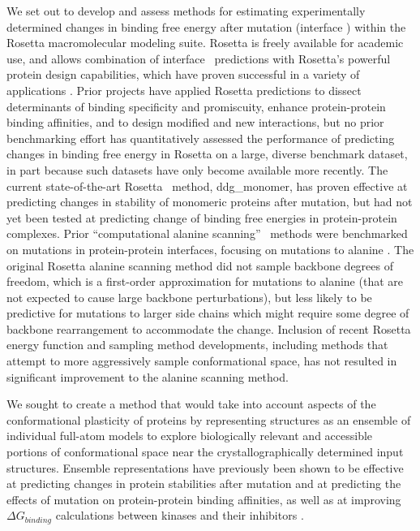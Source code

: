 We set out to develop and assess methods for estimating experimentally determined changes in binding free energy after mutation (interface \ddg) within the Rosetta macromolecular modeling suite. Rosetta is freely available for academic use, and allows combination of interface \ddg\ predictions with Rosetta's powerful protein design capabilities, which have proven successful in a variety of applications \cite{mandell_computer-aided_2009,kaufmann_practically_2010}.
Prior projects have applied Rosetta predictions to
dissect determinants of binding specificity and promiscuity\cite{boulanger_convergent_2003,mcfarland_symmetry_2003},
enhance protein-protein binding affinities\cite{sammond_structure-based_2007,song_rational_2006},
and to design modified\cite{kapp_control_2012}
and new interactions\cite{chevalier_design_2002,fleishman_computational_2011,chevalier_massively_2017}, but no prior benchmarking effort has quantitatively assessed the performance of predicting changes in binding free energy in Rosetta on a large, diverse benchmark dataset, in part because such datasets have only become available more recently.
The current state-of-the-art Rosetta \ddg\ method,  ddg\_monomer\cite{kellogg_role_2011}, has proven effective at predicting changes in stability of monomeric proteins after mutation, but had not yet been tested at predicting change of binding free energies in protein-protein complexes.
Prior ``computational alanine scanning'' \ddg\ methods were benchmarked on mutations in protein-protein interfaces, focusing on mutations to alanine \cite{kortemme_simple_2002,kortemme_computational_2004,conchuir_web_2015}.
The original Rosetta alanine scanning method\cite{kortemme_simple_2002} did not sample backbone degrees of freedom, which is a first-order approximation for mutations to alanine (that are not expected to cause large backbone perturbations\cite{cunningham_high-resolution_1989}), but less likely to be predictive for mutations to larger side chains which might require some degree of backbone rearrangement to accommodate the change.
Inclusion of recent Rosetta energy function and sampling method developments, including methods that attempt to more aggressively sample conformational space, has not resulted in significant improvement to the alanine scanning method\cite{conchuir_web_2015}.

We sought to create a method that would take into account aspects of the conformational plasticity of proteins by representing structures as an ensemble of individual full-atom models to explore biologically relevant and accessible portions of conformational space near the crystallographically determined input structures.
Ensemble representations have previously been shown to be effective at predicting changes in protein stabilities after mutation\cite{davey_prediction_2015} and at predicting the effects of mutation on protein-protein binding affinities\cite{benedix_predicting_2009}, as well as at improving $\Delta G_{binding}$ calculations between kinases and their inhibitors \cite{araki_effect_2016}.

